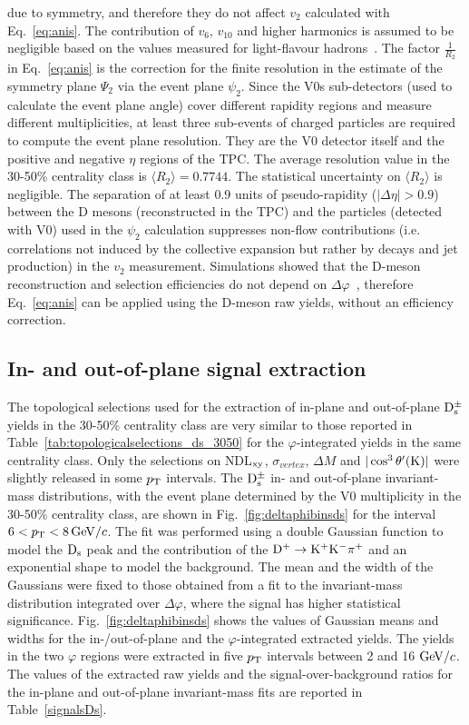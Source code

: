 due to symmetry, and therefore they do not affect $v_2$ calculated with 
Eq.~\ref{eq:anis}. The contribution of $v_6$, $v_10$ and higher 
harmonics is assumed to be negligible based on the 
values measured for light-flavour hadrons~\cite{Aamodt:2011by,ATLAS:2012atc}.
The factor $\frac{1}{R_2}$ in Eq.~\ref{eq:anis} is the correction for the finite resolution in the
estimate of the symmetry plane $\Psi_2$ via the event plane $\psi_2$.
Since the V0s sub-detectors (used to calculate the event plane angle)
cover different rapidity regions and measure different multiplicities, at least 
three sub-events of charged particles are required to compute the event plane resolution.
They are the V0 detector itself and the 
positive and negative $\eta$ regions of the TPC.
The average resolution value in the 30-50\% centrality class is
$\langle R_2 \rangle = 0.7744$. The statistical uncertainty on 
$\langle R_2 \rangle$ is negligible. 
The separation of at least 0.9 units of pseudo-rapidity 
($|\Delta\eta|>0.9$) between the D mesons (reconstructed in the TPC)
and the particles (detected with V0) used in the $\psi_2$ calculation
suppresses non-flow contributions (i.e.\,correlations not 
induced by the collective expansion but rather by decays and 
jet production) in the $v_2$ measurement.
 Simulations showed that the D-meson reconstruction 
 and selection efficiencies do not depend on $\Delta\varphi$~\cite{Abelev:2014ipa}, 
therefore Eq.~\ref{eq:anis} can be applied using the 
D-meson raw yields, without an efficiency correction.

 \subsection{In- and out-of-plane signal extraction}
 \label{sec:SigExtracV2}
 The topological selections used for the extraction of
 in-plane and out-of-plane ${\rm D_s^{\pm}}$ yields in the 30-50\% centrality class
 are very similar to those reported in Table~\ref{tab:topologicalselections_ds_3050} for the
 $\varphi$-integrated yields in the same centrality class.
 Only the selections on NDL$_{\rm xy}$, $\sigma_{vertex}$, $\Delta M$ 
 and $|\cos^3 \theta^\prime({\rm K})|$ were slightly released in some $p_{\rm T}$
 intervals. The ${\rm D_s^{\pm}}$ in- and out-of-plane invariant-mass distributions, 
with the event plane determined by the V0 multiplicity 
in the 30-50\% centrality class, are shown in Fig.~\ref{fig:deltaphibinsds} 
for the interval $6 < p_{\rm T} < 8 \, \mathrm{GeV}/c$.
The fit was performed using a double Gaussian function to model 
the ${\rm D_s}$ peak and the contribution of the ${\rm D^{+}\to K^+ K^-\pi^+}$ and 
an exponential shape to model the background.
The mean and the width of the Gaussians were fixed to those obtained from a fit to
the invariant-mass distribution integrated over $\Delta \varphi$, 
where the signal has higher statistical significance. 
Fig.~\ref{fig:deltaphibinsds} shows the values of Gaussian means and 
widths for the in-/out-of-plane and the $\varphi$-integrated extracted yields.
The yields in the two $\varphi$ regions were extracted in five $p_{\rm T}$ 
intervals between 2 and 16 $\mathrm{GeV}/c$.
The values of the extracted raw yields and the signal-over-background 
ratios for the in-plane and out-of-plane invariant-mass fits 
are reported in Table~\ref{signalsDs}.


